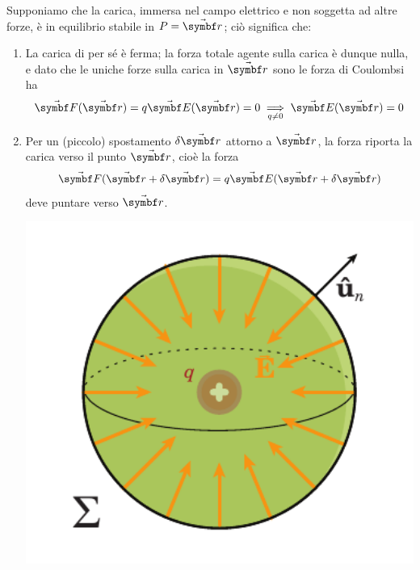 \begin{demonstration}
	Supponiamo che la carica, immersa nel campo elettrico e non soggetta ad altre forze, è in equilibrio stabile in $P=\vba{r}$; ciò significa che:
	\begin{enumerate}
		\item La carica di per sé è ferma; la forza totale agente sulla carica è dunque nulla, e dato che le uniche forze sulla carica in $\vba{r}$ sono le forza di Coulombsi ha
		\begin{equation*}
			\vba{F}(\vba{r})=q\vba{E}(\vba{r})=0\underset{q\neq 0}{\implies}\vba{E}(\vba{r})=0
		\end{equation*}
		\item Per un (piccolo) spostamento $\delta \vba{r}$ attorno a $\vba{r}$, la forza riporta la carica verso il punto $\vba{r}$, cioè la forza
		\begin{equation*}
			\vba{F}(\vba{r}+\delta\vba{r})=q\vba{E}(\vba{r}+\delta\vba{r})
		\end{equation*}
		deve puntare verso $\vba{r}$.\\
		\begin{minipage}{0.35\textwidth}
			\begin{center}
				\includegraphics[width=1\textwidth]{images/chp2/chp2earnshaw.pdf}
			\end{center}
		\end{minipage}\hspace{5pt}
		\begin{minipage}{0.54\textwidth}

\end{minipage}
\end{enumerate}
\end{demonstration}
